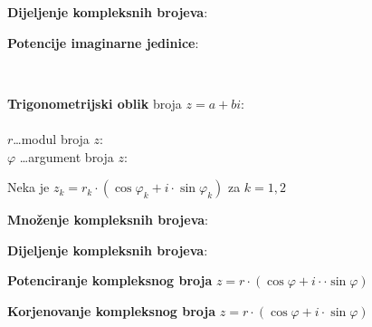 \documentclass[8pt,oneside,a4paper]{report}
\begin{document}
\noindent
\textbf{Dijeljenje kompleksnih brojeva}:\hspace{5mm}

\noindent
\textbf{Potencije imaginarne jedinice}:\hspace{5mm}
\hspace{5mm}
\hspace{5mm}
\hspace{5mm}

\begin{center}
\end{center}
\begin{floatingfigure}[r]{55mm}
\\
\end{floatingfigure}
\noindent
\textbf{Trigonometrijski oblik} broja $z=a+bi$:\\
\hspace*{20mm}\\
\hspace*{10mm}$r$\dots modul broja $z$:\hspace{5mm}\\
\noindent
\hspace*{10mm}$\varphi$ \dots argument broja $z$:\hspace{5mm}

\noindent
{\scriptsize Neka je $z_k=r_k\cdot (\cos \varphi_k+i\cdot \sin\varphi_k)$ za $k=1,2$}

\noindent
\textbf{Mno\v{z}enje kompleksnih brojeva}:\hspace{5mm}

\noindent
\textbf{Dijeljenje kompleksnih brojeva}:\hspace{5mm}

\noindent
\textbf{Potenciranje kompleksnog broja} $z=r\cdot (\cos \varphi+i\cdot \cdot \sin\varphi)$\\
\hspace*{25mm}

\noindent
\textbf{Korjenovanje kompleksnog broja} $z=r\cdot (\cos \varphi+i\cdot \sin\varphi)$\\
\hspace*{25mm}

\hfill{}
\end{document}
